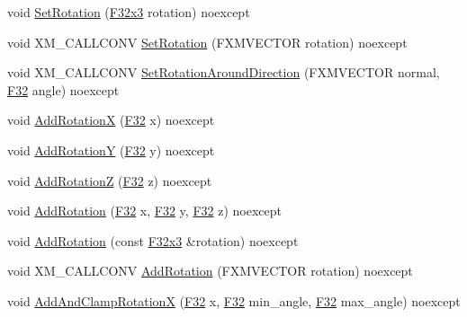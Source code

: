 \begin{DoxyCompactItemize}
\item 
void \hyperlink{classmage_1_1_local_transform_aad6d2bf0eba13e47e90023edcdc55c47}{Set\+Rotation} (\hyperlink{namespacemage_a73fbe0da4b8d5bc156bb8453e5b63a17}{F32x3} rotation) noexcept
\item 
void X\+M\+\_\+\+C\+A\+L\+L\+C\+O\+NV \hyperlink{classmage_1_1_local_transform_a470961f6e4f3b0920742489722ca791e}{Set\+Rotation} (F\+X\+M\+V\+E\+C\+T\+OR rotation) noexcept
\item 
void X\+M\+\_\+\+C\+A\+L\+L\+C\+O\+NV \hyperlink{classmage_1_1_local_transform_a366b1cbd069bce035a868a8800dc04e9}{Set\+Rotation\+Around\+Direction} (F\+X\+M\+V\+E\+C\+T\+OR normal, \hyperlink{namespacemage_aa97e833b45f06d60a0a9c4fc22ae02c0}{F32} angle) noexcept
\item 
void \hyperlink{classmage_1_1_local_transform_ab9d98b568a7384896857e2d6e72342db}{Add\+RotationX} (\hyperlink{namespacemage_aa97e833b45f06d60a0a9c4fc22ae02c0}{F32} x) noexcept
\item 
void \hyperlink{classmage_1_1_local_transform_adea3848a1d4d83a836d33668f323bb4d}{Add\+RotationY} (\hyperlink{namespacemage_aa97e833b45f06d60a0a9c4fc22ae02c0}{F32} y) noexcept
\item 
void \hyperlink{classmage_1_1_local_transform_ac769e25872e8a738bd6189f2ca6db4ea}{Add\+RotationZ} (\hyperlink{namespacemage_aa97e833b45f06d60a0a9c4fc22ae02c0}{F32} z) noexcept
\item 
void \hyperlink{classmage_1_1_local_transform_af4f3c10c99796ed8b71841bfd94e578d}{Add\+Rotation} (\hyperlink{namespacemage_aa97e833b45f06d60a0a9c4fc22ae02c0}{F32} x, \hyperlink{namespacemage_aa97e833b45f06d60a0a9c4fc22ae02c0}{F32} y, \hyperlink{namespacemage_aa97e833b45f06d60a0a9c4fc22ae02c0}{F32} z) noexcept
\item 
void \hyperlink{classmage_1_1_local_transform_a388e221978d1d8fb384ca1728301d4ab}{Add\+Rotation} (const \hyperlink{namespacemage_a73fbe0da4b8d5bc156bb8453e5b63a17}{F32x3} \&rotation) noexcept
\item 
void X\+M\+\_\+\+C\+A\+L\+L\+C\+O\+NV \hyperlink{classmage_1_1_local_transform_a44da0f859b1687cd5846928bfc6d602e}{Add\+Rotation} (F\+X\+M\+V\+E\+C\+T\+OR rotation) noexcept
\item 
void \hyperlink{classmage_1_1_local_transform_ad706493a65d14c9decbeec3e52c25316}{Add\+And\+Clamp\+RotationX} (\hyperlink{namespacemage_aa97e833b45f06d60a0a9c4fc22ae02c0}{F32} x, \hyperlink{namespacemage_aa97e833b45f06d60a0a9c4fc22ae02c0}{F32} min\+\_\+angle, \hyperlink{namespacemage_aa97e833b45f06d60a0a9c4fc22ae02c0}{F32} max\+\_\+angle) noexcept

\end{DoxyCompactItemize}
